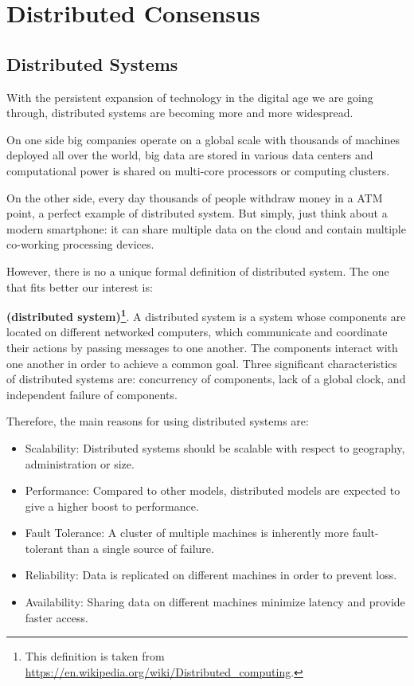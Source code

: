 \chapter{Distributed Consensus}
\label{chpr:consensus}

\bigskip
\section{Distributed Systems}
\label{sec:distributed-systems}
With the persistent expansion of technology in the digital age we are going through, distributed systems are becoming more and more widespread.

\bigskip
\noindent
On one side big companies operate on a global scale with thousands of machines deployed all over the world, big data are stored in various data centers and computational power is shared on multi-core processors or computing clusters.

\bigskip
\noindent
On the other side, every day thousands of people withdraw money in a ATM point, a perfect example of distributed system. But simply, just think about a modern smartphone: it can share multiple data on the cloud and contain multiple co-working processing devices.

\bigskip
\noindent
However, there is no a unique formal definition of distributed system. The one that fits better our interest is:
\begin{mydef} {\bf (distributed system)\textup{\footnote{This definition is taken from \url{https://en.wikipedia.org/wiki/Distributed_computing}.}}}.
    A distributed system is a system whose components are located on different networked computers, which communicate and coordinate their actions by passing messages to one another. The components interact with one another in order to achieve a common goal. Three significant characteristics of distributed systems are: concurrency of components, lack of a global clock, and independent failure of components.
\end{mydef}

\bigskip
\noindent
Therefore, the main reasons for using distributed systems are:
\begin{itemize}
    \item Scalability: Distributed systems should be scalable with respect to geography, administration or size.
    \item Performance: Compared to other models, distributed models are expected to give a higher boost to performance.
    \item Fault Tolerance: A cluster of multiple machines is inherently more fault-tolerant than a single source of failure.
    \item Reliability: Data is replicated on different machines in order to prevent loss.
    \item Availability: Sharing data on different machines minimize latency and provide faster access.
\end{itemize}


